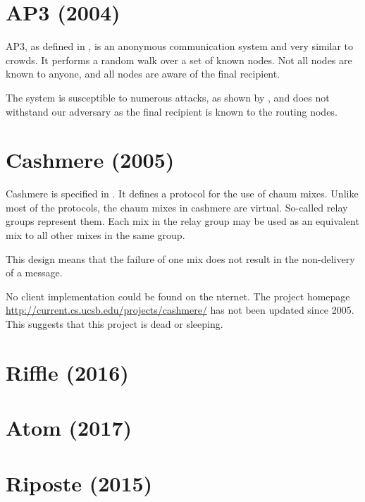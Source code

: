 \section{AP3 (2004)}
AP3, as defined in \cite{mislove2004ap3}, is an anonymous communication system and very similar to crowds. It performs a random walk over a set of known nodes. Not all nodes are known to anyone, and all nodes are aware of the final recipient. 

The system is susceptible to numerous attacks, as shown by \cite{ccs2008:mittal}, and does not withstand our adversary as the final recipient is known to the routing nodes.

\section{Cashmere (2005)}
Cashmere is specified in \cite{zhuang2005cashmere}. It defines a protocol for the use of chaum mixes. Unlike most of the protocols, the chaum mixes in cashmere are virtual. So-called relay groups represent them. Each mix in the relay group may be used as an equivalent mix to all other mixes in the same group. 

This design means that the failure of one mix does not result in the non-delivery of a message.

No client implementation could be found on the \textit{}nternet. The project homepage \href{http://current.cs.ucsb.edu/projects/cashmere/}{http://current.cs.ucsb.edu/projects/cashmere/} has not been updated since 2005. This suggests that this project is dead or sleeping.

\section{Riffle (2016)}
\cite{kwon2016riffle}

%

\section{Atom (2017)}
\cite{kwon2017atom}

%

\section{Riposte (2015)}
\cite{corrigan2015riposte}

%

